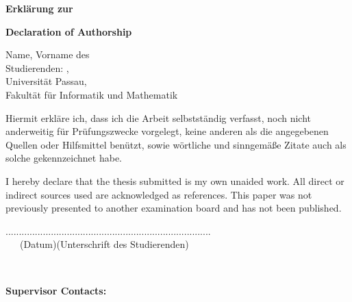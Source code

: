 
\thispagestyle{empty}

\begin{center}
\huge{\textbf{Erkl\"arung zur \thesistype}}

\huge{\textbf{Declaration of Authorship}}
\end{center}
\vspace{2.5cm}
Name, Vorname des\\Studierenden: \hspace{5cm} \authornamelast,~\authornamefirst~\authornamemiddle
\vspace{2cm}
\\Universit\"at Passau,\\
Fakult\"at f\"ur Informatik und Mathematik
\vspace{2.5cm}
\begin{center}
Hiermit erkl\"are ich, dass ich die Arbeit selbstst\"andig verfasst, noch nicht anderweitig
f\"ur Pr\"ufungszwecke vorgelegt, keine anderen als die angegebenen Quellen oder Hilfsmittel
ben\"utzt, sowie w\"ortliche und sinngem\"a\ss{}e Zitate auch als solche gekennzeichnet habe.

I hereby declare that the thesis submitted is my own unaided work. All direct or indirect sources used are acknowledged as references. This paper was not previously presented to another examination board and has not been published.
\end{center}
\vspace{3.5cm}
.........................\hfill....................................................\\
~~~(Datum)\hfill(Unterschrift des Studierenden)

\cleardoublepage
~
\vfill


\textbf{Supervisor Contacts:} \smallskip \\
\contactprofone\\
\contactproftwo\\
\contactsupervisor\\

\cleardoublepage